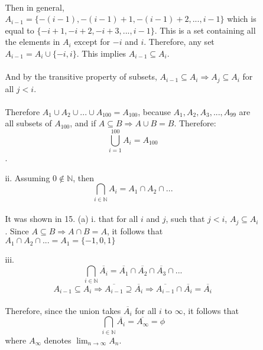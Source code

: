 \documentclass{article}
\begin{document}
\begin{enumerate}
\begin{enumerate}
\begin{enumerate}
						\paragraph{}
						Then in general, \(A_{i-1} = \{-(i-1), -(i-1)+1, -(i-1)+2, ..., i-1\}\) which is equal to \(\{-i+1, -i+2, -i+3, ..., i-1\}\). This is a set containing all the elements in \(A_{i}\) except for \(-i\) and \(i\). Therefore, any set \(A_{i-1} = A_{i} \cup \{-i, i\}\). This implies \(A_{i-1} \subseteq A_{i}\).

						\paragraph{}
						And by the transitive property of subsets, \(A_{i-1} \subseteq A_{i} \Rightarrow A_{j} \subseteq A_{i}\) for all \(j<i\).

						\paragraph{}
						Therefore \(A_{1} \cup A_{2} \cup ... \cup A_{100} = A_{100}\), because \(A_{1}, A_{2}, A_{3}, ..., A_{99}\) are all subsets of \(A_{100}\), and if \(A \subseteq B \Rightarrow A \cup B = B\). Therefore:
						\[\bigcup_{i=1}^{100}A_{i} = A_{100}\].

					\item[ii.]
						Assuming \(0 \notin \mathbb{N}\), then 
						\[\bigcap_{i \in \mathbb{N}}A_{i} = A_{1} \cap A_{2} \cap ...\]

						\paragraph{}
						It was shown in 15. (a) i. that for all \(i\) and \(j\), such that \(j < i\), \(A_{j} \subseteq A_{i}\). Since \(A \subseteq B \Rightarrow A \cap B = A\), it follows that \(A_{1} \cap A_{2} \cap ... = A_{1} = \{-1, 0, 1\}\)

					\item[iii.]
						\[\bigcap_{i \in \mathbb{N}}\overline{A_{i}} = \overline{A_{1}} \cap \overline{A_{2}} \cap \overline{A_{3}} \cap ...\]
						\[A_{i-1} \subseteq A_{i} \Rightarrow \overline{A_{i-1}} \supseteq \overline{A_{i}} \Rightarrow \overline{A_{i-1}} \cap \overline{A_{i}} = \overline{A_{i}}\]

						\paragraph{}
						Therefore, since the union takes \(\overline{A_{i}}\) for all \(i\) to \(\infty\), it follows that 
						\[\bigcap_{i \in \mathbb{N}}\overline{A_{i}} = \overline{A_{\infty}} = \phi\]
						where \(A_{\infty}\) denotes \(\lim_{n \to \infty}A_{n}\).
					

\end{enumerate}
\end{enumerate}
\end{enumerate}
\end{document}
